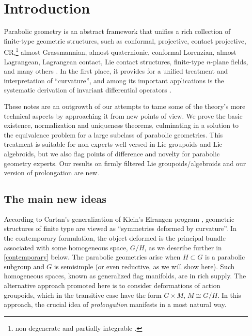 \documentclass[leqno,12pt]{amsart} %
\newcommand\refreshpage{\newpage}
\newcommand\refreshpage{}
\begin{document}
\refreshpage
\section{Introduction}
Parabolic geometry is an abstract framework that unifies a rich collection of finite-type
geometric structures, such as conformal, projective, contact projective,
CR,\footnote{non-degenerate and partially integrable \cite[p.414]{Cap_Slovak_09}.} almost
Grassmannian, almost quaternionic, conformal Lorenzian, almost Lagrangean, Lagrangean
contact, Lie contact structures, finite-type $n$-plane fields, and many others
\cite[Chapter 4]{Cap_Slovak_09}. In the first place, it provides for a unified treatment
and interpretation of ``curvature'', and among its important applications is the
systematic derivation of invariant differential operators
\cite{Cap_etal_01,Calderbank_Diemer_01,Cap_Soucek_07,Cap_Soucek_12}.

These notes are an outgrowth of our attempts to tame some of the theory's more technical
aspects by approaching it from new points of view.  We prove the basic existence,
normalization and uniqueness theorems, culminating in a solution to the equivalence
problem for a large subclass of parabolic geometries. This treatment is suitable for
non-experts well versed in Lie groupoids and Lie algebroids, but we also flag points of
difference and novelty for parabolic geometry experts. Our results on firmly filtered Lie
groupoids/algebroids and our version of prolongation are new.

\subsection{The main new ideas}\label{firstfirst}
According to Cartan's generalization of Klein's Elrangen program \cite{Sharpe_97},
geometric structures of finite type are viewed as ``symmetries deformed by curvature''. In
the contemporary formulation, the object deformed is the principal bundle associated with
some homogeneous space, $G/H$, as we describe further in \ref{contemporary} below.  The
parabolic geometries arise when $H \subset G$ is a parabolic subgroup and $G$ is
semisimple (or even reductive, as we will show here). Such homogeneous spaces, known as
generalized flag manifolds, are in rich supply. The alternative approach promoted here is
to consider deformations of action groupoids, which in the transitive case have the form
$G \times M$, $M \cong G/H$. In this approach, the crucial idea of {\em prolongation}
manifests in a most natural way.
\end{document}
